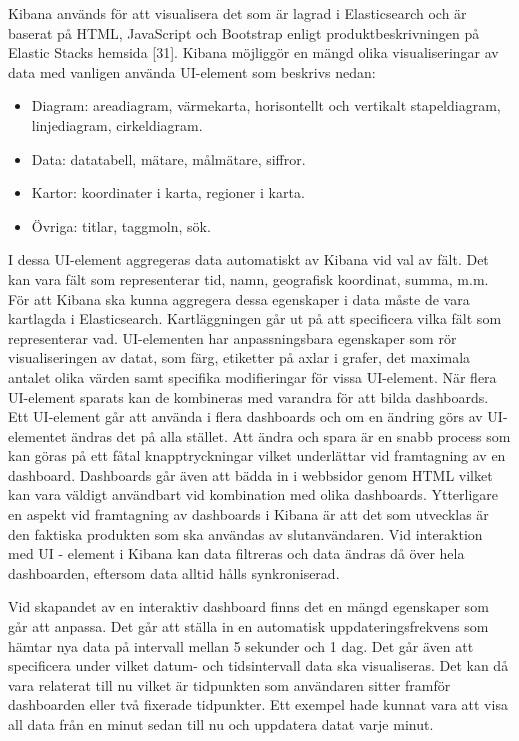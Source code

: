 \documentclass{kththesis}
\begin{document}
Kibana används för att visualisera det som är lagrad i Elasticsearch och är baserat på HTML, JavaScript och Bootstrap enligt produktbeskrivningen på Elastic Stacks hemsida [31]. Kibana möjliggör en mängd olika visualiseringar av data med vanligen använda UI-element som beskrivs nedan:

\begin{itemize}
\item Diagram: areadiagram, värmekarta, horisontellt och vertikalt stapeldiagram, linjediagram, cirkeldiagram.
\item Data: datatabell, mätare, målmätare, siffror.
\item Kartor: koordinater i karta, regioner i karta.
\item Övriga: titlar, taggmoln, sök.
\end{itemize}

I dessa UI-element aggregeras data automatiskt av Kibana vid val av fält. Det kan vara fält som representerar tid, namn, geografisk koordinat, summa, m.m. För att Kibana ska kunna aggregera dessa egenskaper i data måste de vara kartlagda i Elasticsearch. Kartläggningen går ut på att specificera vilka fält som representerar vad. UI-elementen har anpassningsbara egenskaper som rör visualiseringen av datat, som färg, etiketter på axlar i grafer, det maximala antalet olika värden samt specifika modifieringar för vissa UI-element. När flera UI-element sparats kan de kombineras med varandra för att bilda dashboards. Ett UI-element går att använda i flera dashboards och om en ändring görs av UI-elementet ändras det på alla stället. Att ändra och spara är en snabb process som kan göras på ett fåtal knapptryckningar vilket underlättar vid framtagning av en dashboard. Dashboards går även att bädda in i webbsidor genom HTML vilket kan vara väldigt användbart vid kombination med olika dashboards. Ytterligare en aspekt vid framtagning av dashboards i Kibana är att det som utvecklas är den faktiska produkten som ska användas av slutanvändaren. Vid interaktion med UI - element i Kibana kan data filtreras och data ändras då över hela dashboarden, eftersom data alltid hålls synkroniserad.

Vid skapandet av en interaktiv dashboard finns det en mängd egenskaper som går att anpassa. Det går att ställa in en automatisk uppdateringsfrekvens som hämtar nya data på intervall mellan 5 sekunder och 1 dag. Det går även att specificera under vilket datum- och tidsintervall data ska visualiseras. Det kan då vara relaterat till nu vilket är tidpunkten som användaren sitter framför dashboarden eller två fixerade tidpunkter. Ett exempel hade kunnat vara att visa all data från en minut sedan till nu och uppdatera datat varje minut.
\end{document}
